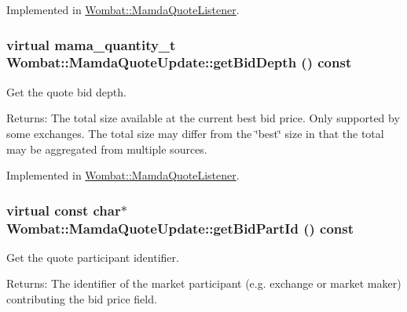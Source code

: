 Implemented in \hyperlink{classWombat_1_1MamdaQuoteListener_578f45a1ddaa18b8447cda08b943153e}{Wombat::Mamda\-Quote\-Listener}.\hypertarget{classWombat_1_1MamdaQuoteUpdate_7b65c1e8843a0a42c422e26da7a22ef0}{
\subsubsection[getBidDepth]{\setlength{\rightskip}{0pt plus 5cm}virtual mama\_\-quantity\_\-t Wombat::Mamda\-Quote\-Update::get\-Bid\-Depth () const}}
\label{classWombat_1_1MamdaQuoteUpdate_7b65c1e8843a0a42c422e26da7a22ef0}


Get the quote bid depth. 

\begin{Desc}
\item[Returns:]The total size available at the current best bid price. Only supported by some exchanges. The total size may differ from the \char`\"{}best\char`\"{} size in that the total may be aggregated from multiple sources. \end{Desc}


Implemented in \hyperlink{classWombat_1_1MamdaQuoteListener_3f4909f6e25bef5324df4c4fa89bda74}{Wombat::Mamda\-Quote\-Listener}.\hypertarget{classWombat_1_1MamdaQuoteUpdate_fb8009221e0d9b5094c6047d21326cc0}{
\subsubsection[getBidPartId]{\setlength{\rightskip}{0pt plus 5cm}virtual const char$\ast$ Wombat::Mamda\-Quote\-Update::get\-Bid\-Part\-Id () const}}
\label{classWombat_1_1MamdaQuoteUpdate_fb8009221e0d9b5094c6047d21326cc0}


Get the quote participant identifier. 

\begin{Desc}
\item[Returns:]The identifier of the market participant (e.g. exchange or market maker) contributing the bid price field. \end{Desc}



